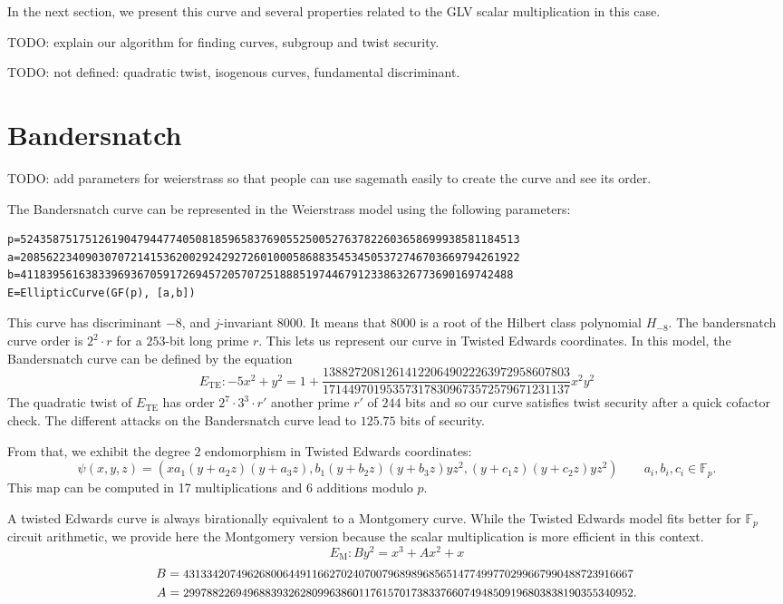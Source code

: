 \documentclass{amsart}
\newcommand{\SM}[1]{\color{blue}#1\color{black}}
\newcommand{\Fp}{\ensuremath{\mathbb F_p}}
\begin{document}
In the next section, we present this curve and several properties
related to the  GLV scalar multiplication in this case.

\SM{TODO: explain our algorithm for finding curves, subgroup and twist
  security.}

\SM{TODO: not defined: quadratic twist, isogenous curves, fundamental
  discriminant.}

\section{Bandersnatch} 

\SM{TODO: add parameters for weierstrass so that people can use sagemath
  easily to create the curve and see its order.}

The Bandersnatch curve can be represented in the Weierstrass model
using the following parameters:
\begin{verbatim}
p=52435875175126190479447740508185965837690552500527637822603658699938581184513
a=20856223409030707214153620029242927260100058688354534505372746703669794261922
b=4118395616383396936705917269457205707251888519744679123386326773690169742488
E=EllipticCurve(GF(p), [a,b])
\end{verbatim}
This curve has discriminant $-8$, and $j$-invariant $8000$. It means
that $8000$ is a root of the Hilbert class polynomial $H_{-8}$.
The bandersnatch curve order is $2^2\cdot r$ for a $253$-bit long
prime $r$.
This lets us represent our curve in Twisted Edwards coordinates.
In this model, the Bandersnatch curve can be defined by the equation
$$E_\text{TE}:-5x^2+y^2 = 1 + \frac{138827208126141220649022263972958607803}{171449701953573178309673572579671231137}x^2y^2$$ 
The quadratic twist of $E_\text{TE}$ has order $2^7 \cdot 3^3 \cdot r'$ another
prime $r'$ of $244$ bits
and so our curve satisfies twist security after a quick cofactor
check.
The different attacks on the Bandersnatch curve lead to $125.75$ bits
of security.

From that, we exhibit the degree $2$ endomorphism in Twisted Edwards
coordinates:
$$\psi(x,y,z) = (xa_1(y+a_2z)(y+a_3z), b_1(y+b_2z)(y+b_3z)yz^2,
(y+c_1z)(y+c_2z)yz^2) \qquad a_i, b_i, c_i \in \Fp.$$
This map can be computed in 17 multiplications and 6 additions modulo $p$.

A twisted Edwards curve is always birationally equivalent to a
Montgomery curve.
While the Twisted Edwards model fits better for $\mathbb F_p$ circuit
arithmetic, we provide here the Montgomery version because the scalar
multiplication is more efficient in this context.
$$E_\text{M}: By^2 = x^3 + Ax^2 + x$$
\begin{align*}
  B &= \text{\small{43133420749626800644911662702407007968989685651477499770299667990488723916667}}\\
  A &= \text{\small{29978822694968839326280996386011761570173833766074948509196803838190355340952}}.
\end{align*}
\end{document}

